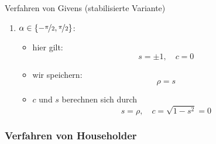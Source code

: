 \begin{bonus}{Verfahren von Givens (stabilisierte Variante)}
\begin{itemize}
\begin{enumerate}
\begin{itemize}
                            \item damit günstiger $c$ statt $s$ abzuspeichern
                            \item $c$ legt nur den Betrag von $s$ fest, das Vorzeichen muss separat behandelt werden
                            \item um zusätzlich diesen Fall vom vorherigen zu unterscheiden benutzen wir:\footnote{Der Fall ist unterscheidbar, da $|p| = \nicefrac{1}{c} > \nicefrac{2}{\sqrt{2}} = \sqrt{2} > 1$, sonst ist $\rho \leq 1$.}
                                  \[
                                      \rho = \frac{\sign(s)}{c}
                                  \]
                            \item $c$ und $s$ berechnen sich durch
                                  \[
                                      c = \frac{1}{\rho}, \quad s = \sign(\rho) \cdot \sqrt{1 - c^2}
                                  \]
                        \end{itemize}
                  \item $\alpha \in \{ -\nicefrac{\pi}{2}, \nicefrac{\pi}{2} \}$:
                        \begin{itemize}
                            \item hier gilt:
                                  \[
                                      s = \pm 1, \quad c = 0    
                                  \]
                            \item wir speichern:
                                  \[
                                      \rho = s    
                                  \]
                            \item $c$ und $s$ berechnen sich durch
                                  \[
                                      s = \rho, \quad c = \sqrt{1 - s^2} = 0  
                                  \]
                        \end{itemize}
              \end{enumerate}
    \end{itemize}
\end{bonus}

\subsubsection{Verfahren von Householder}

